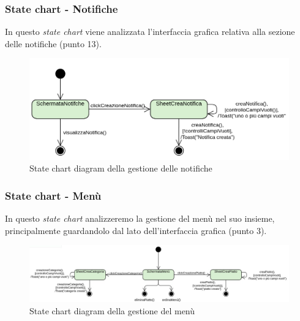 \subsubsection{State chart - Notifiche}
In questo \textit{state chart} viene analizzata l'interfaccia grafica relativa alla sezione delle notifiche (punto 13).
\begin{figure}[H]
  \centering
  \includegraphics[scale=0.6]{img/stateChart/gestioneNotifiche_state_chart.png}
  \caption{State chart diagram della gestione delle notifiche}
\end{figure}  

\newpage
\subsubsection{State chart - Menù}
In questo \textit{state chart} analizzeremo la gestione del menù nel suo insieme, principalmente guardandolo dal lato dell'interfaccia grafica (punto 3).
\begin{figure}[H]
  \centering
  \includegraphics[scale=0.4]{img/stateChart/gestioneMenu_state_chart.png}
  \caption{State chart diagram della gestione del menù}
\end{figure}  

\newpage
